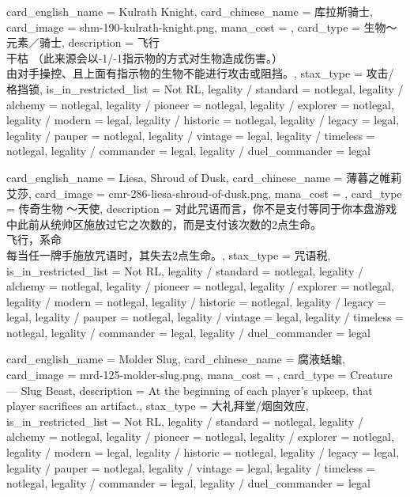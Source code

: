 \documentclass[lang = cn, color = black, 10pt]{AllThatStax}
\begin{document}
\card
{
	card_english_name = {Kulrath Knight},
	card_chinese_name = {库拉斯骑士},
	card_image = shm-190-kulrath-knight.png,
	mana_cost = ,
	card_type = 生物～元素／骑士,
	description = {飞行\\
		干枯 （此来源会以-1/-1指示物的方式对生物造成伤害。）\\
		由对手操控、且上面有指示物的生物不能进行攻击或阻挡。},
	stax_type = 攻击/格挡锁,
	is_in_restricted_list = Not RL,
	legality / standard = notlegal,
	legality / alchemy = notlegal,
	legality / pioneer = notlegal,
	legality / explorer = notlegal,
	legality / modern = legal,
	legality / historic = notlegal,
	legality / legacy = legal,
	legality / pauper = notlegal,
	legality / vintage = legal,
	legality / timeless = notlegal,
	legality / commander = legal,
	legality / duel_commander = legal
}

\card
{
	card_english_name = {Liesa, Shroud of Dusk},
	card_chinese_name = {薄暮之帷莉艾莎},
	card_image = cmr-286-liesa-shroud-of-dusk.png,
	mana_cost = ,
	card_type = 传奇生物 ～天使,
	description = {对此咒语而言，你不是支付等同于你本盘游戏中此前从统帅区施放过它之次数的，而是支付该次数的2点生命。\\
		飞行，系命\\
		每当任一牌手施放咒语时，其失去2点生命。},
	stax_type = 咒语税,
	is_in_restricted_list = Not RL,
	legality / standard = notlegal,
	legality / alchemy = notlegal,
	legality / pioneer = notlegal,
	legality / explorer = notlegal,
	legality / modern = notlegal,
	legality / historic = notlegal,
	legality / legacy = legal,
	legality / pauper = notlegal,
	legality / vintage = legal,
	legality / timeless = notlegal,
	legality / commander = legal,
	legality / duel_commander = legal
}

\card
{
	card_english_name = {Molder Slug},
	card_chinese_name = {腐液蛞蝓},
	card_image = mrd-125-molder-slug.png,
	mana_cost = ,
	card_type = Creature — Slug Beast,
	description = {At the beginning of each player's upkeep, that player sacrifices an artifact.},
	stax_type = 大礼拜堂/烟囱效应,
	is_in_restricted_list = Not RL,
	legality / standard = notlegal,
	legality / alchemy = notlegal,
	legality / pioneer = notlegal,
	legality / explorer = notlegal,
	legality / modern = legal,
	legality / historic = notlegal,
	legality / legacy = legal,
	legality / pauper = notlegal,
	legality / vintage = legal,
	legality / timeless = notlegal,
	legality / commander = legal,
	legality / duel_commander = legal
}
\end{document}
